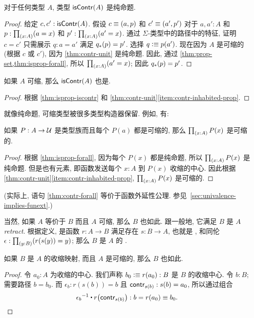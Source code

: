 \begin{lem}
    \label{thm:isprop-iscontr}
    对于任何类型 $A$, 类型 $\mathsf{isContr}(A)$ 是纯命题.
\end{lem}
\begin{proof}
    给定 $c,c':\mathsf{isContr}(A)$.
    假设 $c\equiv(a,p)$ 和 $c'\equiv(a',p')$ 对于 $a,a':A$ 和 $p:\prd{x:A} (a=x)$ 和 $p':\prd{x:A} (a'=x)$.
    通过 $\Sigma$-类型中的路径中的特征, 证明 $c=c'$ 只需展示 $q:a=a'$ 满足 ${q}_{*}\mathopen{}\left({p}\right)\mathclose{}=p'$.
    选择 $q\vcentcolon\equiv p(a')$.
    现在因为 $A$ 是可缩的 (根据 $c$ 或 $c'$), 因为 \cref{thm:contr-unit} 是纯命题.
    因此, 通过 \cref{thm:prop-set,thm:isprop-forall}, 所以 $\prd{x:A}(a'=x)$; 因此 ${q}_{*}\mathopen{}\left({p}\right)\mathclose{}=p'$.
\end{proof}

\begin{cor}
    \label{thm:contr-contr}
    如果 $A$ 可缩, 那么 $\mathsf{isContr}(A)$ 也是.
\end{cor}
\begin{proof}
    根据 \cref{thm:isprop-iscontr} 和 \cref{thm:contr-unit}\ref{item:contr-inhabited-prop}.
\end{proof}

就像纯命题, 可缩类型被很多类型构造器保留.
例如, 有:

\begin{lem}
    \label{thm:contr-forall}
    如果 $P:A\to\mathcal{U}$ 是类型族而且每个 $P(a)$ 都是可缩的, 那么 $\prd{x:A} P(x)$ 是可缩的.
\end{lem}
\begin{proof}
    根据 \cref{thm:isprop-forall}, 因为每个 $P(x)$ 都是纯命题, 所以 $\prd{x:A} P(x)$ 是纯命题.
    但是也有元素, 即函数发送每个 $x:A$ 到 $P(x)$ 收缩的中心.
    因此根据 \cref{thm:contr-unit}\ref{item:contr-inhabited-prop}, $\prd{x:A} P(x)$ 是可缩的.
\end{proof}

%
(实际上, 语句 \cref{thm:contr-forall} 等价于函数外延性公理.
参见~\cref{sec:univalence-implies-funext}.)

当然, 如果 $A$ 等价于 $B$ 而且 $A$ 可缩, 那么 $B$ 也如此.
跟一般地, 它满足 $B$ 是 $A$ \emph{retract}.
根据定义, 
%
%
是函数 $r : A \to B$ 满足存在 $s : B \to A$, 也就是 ,
%
%
和同伦 $\epsilon:\prd{y:B} (r(s(y))=y)$; 那么 $B$ 是 $A$ 的 %
.

\begin{lem}
    \label{thm:retract-contr}
    如果 $B$ 是 $A$ 的收缩映射, 而且 $A$ 是可缩的, 那么 $B$ 也如此.
\end{lem}
\begin{proof}
    令 $a_0 : A$ 为收缩的中心.
    我们声称 $b_0 \vcentcolon\equiv r(a_0) : B$ 是 $B$ 的收缩中心.
    令 $b : B$; 需要路径 $b = b_0$.
    而 $\epsilon_b : r(s(b)) = b$ 且 $\mathsf{contr}_{s(b)} : s(b) = a_0$, 所以通过组合
    \[ \opp{\epsilon_b} \ct \ap{r}{\contr_{s(b)}} : b = r(a_0) \jdeq b_0. \qedhere\]
\end{proof}

